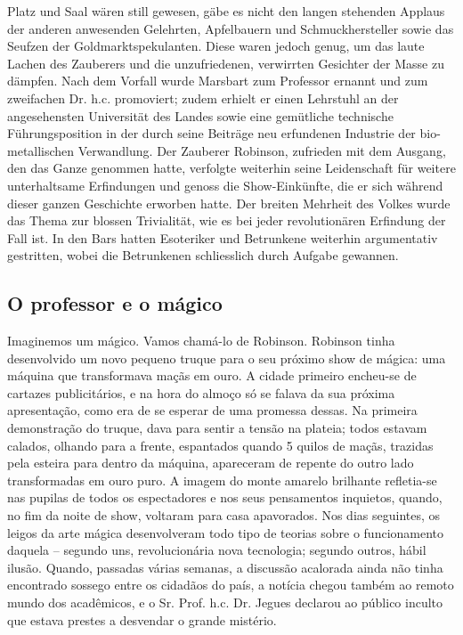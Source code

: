 Platz und Saal wären still gewesen, gäbe es nicht den langen
stehenden Applaus der anderen anwesenden Gelehrten, Apfelbauern
und Schmuckhersteller sowie das Seufzen der
Goldmarktspekulanten. Diese waren jedoch genug, um das laute
Lachen des Zauberers und die unzufriedenen, verwirrten
Gesichter der Masse zu dämpfen. Nach dem Vorfall wurde Marsbart
zum Professor ernannt und zum zweifachen Dr. h.c. promoviert;
zudem erhielt er einen Lehrstuhl an der angesehensten
Universität des Landes sowie eine gemütliche technische
Führungsposition in der durch seine Beiträge neu erfundenen
Industrie der bio-metallischen Verwandlung. Der Zauberer
Robinson, zufrieden mit dem Ausgang, den das Ganze genommen
hatte, verfolgte weiterhin seine Leidenschaft für weitere
unterhaltsame Erfindungen und genoss die Show-Einkünfte, die er
sich während dieser ganzen Geschichte erworben hatte. Der
breiten Mehrheit des Volkes wurde das Thema zur blossen
Trivialität, wie es bei jeder revolutionären Erfindung der Fall
ist. In den Bars hatten Esoteriker und Betrunkene weiterhin
argumentativ gestritten, wobei die Betrunkenen schliesslich
durch Aufgabe gewannen.
\pagebreak
\subsection{O professor e o mágico}
Imaginemos um mágico. Vamos chamá-lo de Robinson. Robinson
tinha desenvolvido um novo pequeno truque para o seu
próximo show de mágica: uma máquina que transformava maçãs em
ouro. A cidade primeiro encheu-se de cartazes
publicitários, e na hora do almoço só se falava da sua próxima
apresentação, como era de se esperar de uma promessa dessas. Na
primeira demonstração do truque, dava para sentir a tensão na
plateia; todos estavam calados, olhando para a frente,
espantados quando 5 quilos de maçãs, trazidas pela esteira para
dentro da máquina, apareceram de repente do outro lado
transformadas em ouro puro. A imagem do monte amarelo brilhante
refletia-se nas pupilas de todos os espectadores e nos seus
pensamentos inquietos, quando, no fim da noite de show,
voltaram para casa apavorados. Nos dias seguintes, os leigos da
arte mágica desenvolveram todo tipo de teorias sobre o
funcionamento daquela – segundo uns, revolucionária nova
tecnologia; segundo outros, hábil ilusão. Quando, passadas
várias semanas, a discussão acalorada ainda não tinha
encontrado sossego entre os cidadãos do país, a notícia chegou
também ao remoto mundo dos acadêmicos, e o Sr. Prof. h.c. Dr.
Jegues declarou ao público inculto que estava prestes a
desvendar o grande mistério.

